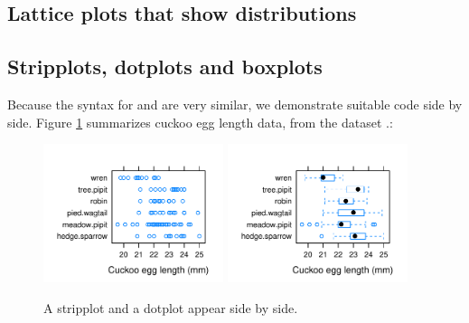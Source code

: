 \subsection{Lattice plots that show distributions}\label{sec:dists}

\subsection*{Stripplots, dotplots and boxplots}\label{ss:stripetc}

Because the syntax for  and  are
very similar, we demonstrate suitable code side by side.  Figure
\ref{fig:strip-bw} summarizes cuckoo egg length data, from the
dataset .:
\vspace*{-9pt}

\begin{figure}
\begin{Schunk}


\centerline{\includegraphics[width=0.47\textwidth]{figs/07-strip-bw-1} \includegraphics[width=0.47\textwidth]{figs/07-strip-bw-2} }

\end{Schunk}
\caption{A stripplot and a dotplot appear side by side.\label{fig:strip-bw}}
\end{figure}

